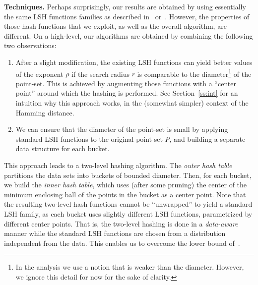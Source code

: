 \documentclass[11pt,letterpaper]{article}
\renewcommand{\paragraph}[1]{{\bf #1.}}
\begin{document}
\paragraph{Techniques} Perhaps surprisingly, our results are obtained by using essentially the same LSH functions families as described in~\cite{ai-nohaa-06} or~\cite{im-anntr-98}. However, the properties of those hash functions that we exploit, as well as the overall algorithm, are different. On a high-level, our algorithms are obtained by combining the following two observations:
\begin{enumerate}
\item After a slight modification, the existing LSH functions can
  yield better values of the exponent $\rho$ if the search radius $r$
  is comparable to the diameter\footnote{In the analysis we use a
    notion that is weaker than the diameter. However, we ignore this
    detail for now for the sake of clarity.} of the point-set. This is
  achieved by augmenting those functions with a ``center point''
  around which the hashing is performed.
  See Section~\ref{ss:int} for an intuition why this approach works, in the (somewhat simpler) context of the Hamming distance.
\item We can ensure that the diameter of the point-set is small by
  applying standard LSH functions to the original point-set $P$, and
  building a separate data structure for each bucket.
\end{enumerate}

This approach leads to a two-level hashing algorithm. The {\em outer
  hash table} partitions the data sets into buckets of bounded
diameter. Then, for each bucket, we build the {\em inner hash table},
which uses (after some pruning) the center of the minimum enclosing
ball of the points in the bucket as a center point.  Note that the
resulting two-level hash functions cannot be ``unwrapped'' to yield a
standard LSH family, as each bucket uses slightly different LSH
functions, parametrized by different center points. That is, the
two-level hashing is done in a {\em data-aware} manner%
while the
standard LSH functions are chosen from a distribution independent from
the data. This enables us to overcome the lower bound of~\cite{owz-olbls-11}.
\end{document}
